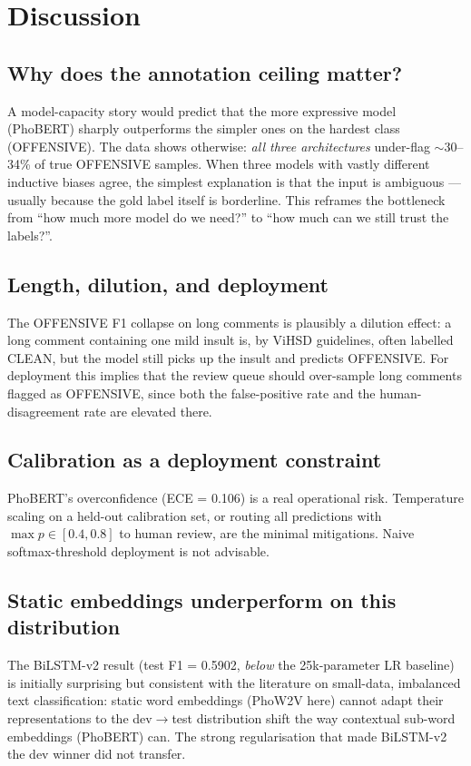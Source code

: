 \documentclass[a4paper,12pt,oneside]{report}
\begin{document}
\chapter{Discussion}
\label{ch:discussion}

\section{Why does the annotation ceiling matter?}
A model-capacity story would predict that the more expressive model
(PhoBERT) sharply outperforms the simpler ones on the hardest class
(OFFENSIVE). The data shows otherwise: \emph{all three architectures}
under-flag $\sim$30--34\% of true OFFENSIVE samples. When three models
with vastly different inductive biases agree, the simplest explanation
is that the input is ambiguous --- usually because the gold label
itself is borderline. This reframes the bottleneck from
``how much more model do we need?'' to ``how much can we still trust
the labels?''.

\section{Length, dilution, and deployment}
The OFFENSIVE F1 collapse on long comments is plausibly a dilution
effect: a long comment containing one mild insult is, by ViHSD
guidelines, often labelled CLEAN, but the model still picks up the
insult and predicts OFFENSIVE. For deployment this implies that the
review queue should over-sample long comments flagged as OFFENSIVE,
since both the false-positive rate and the human-disagreement rate are
elevated there.

\section{Calibration as a deployment constraint}
PhoBERT's overconfidence (ECE = 0.106) is a real operational risk.
Temperature scaling on a held-out calibration set, or routing all
predictions with $\max p \in [0.4, 0.8]$ to human review, are the
minimal mitigations. Naive softmax-threshold deployment is
not advisable.

\section{Static embeddings underperform on this distribution}
The BiLSTM-v2 result (test F1 = 0.5902, \emph{below} the 25k-parameter
LR baseline) is initially surprising but consistent with the
literature on small-data, imbalanced text classification: static
word embeddings (PhoW2V here) cannot adapt their representations to
the dev$\rightarrow$test distribution shift the way contextual
sub-word embeddings (PhoBERT) can. The strong regularisation that
made BiLSTM-v2 the dev winner did not transfer.
\end{document}
